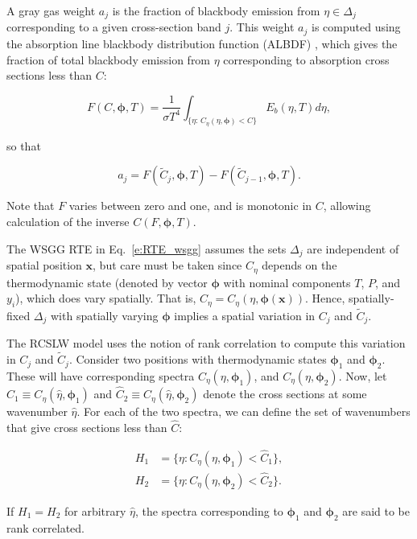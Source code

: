 \documentclass[preprint,12pt]{elsarticle}
\newcommand{\BS}{\boldsymbol}
\newcounter{bla}
\begin{document}
A gray gas weight $a_j$ is the fraction of blackbody emission from $\eta\in\Delta_j$ corresponding to a given cross-section band $j$. This weight $a_j$ is computed using the absorption line blackbody distribution function (ALBDF) \cite{Pearson_2014}, which gives the fraction of total blackbody emission from $\eta$ corresponding to absorption cross sections less than $C$: 
%
\begin{linenomath}
    \begin{equation} \label{e:albdf}
        F(C,\BS{\phi},T) = \frac{1}{\sigma T^4}\int_{\{\eta:\,C_\eta(\eta,\BS{\phi})<C\}}E_b(\eta,T)d\eta,
\end{equation}
\end{linenomath}
%
so that
%
\begin{linenomath}
    \begin{equation}\label{e:aj}
    a_j = F(\tilde{C}_j,\BS{\phi}, T) - F(\tilde{C}_{j-1}, \BS{\phi},T).
\end{equation}
\end{linenomath}
%
Note that $F$ varies between zero and one, and is monotonic in $C$, allowing calculation of the inverse $C(F,\BS{\phi},T)$.

The WSGG RTE in Eq.~\ref{e:RTE_wsgg} assumes the sets $\Delta_j$ are independent of spatial position $\mathbf{x}$, but care must be taken since $C_\eta$ depends on the thermodynamic state (denoted by vector $\BS{\phi}$ with nominal components $T$, $P$, and $y_i$), which does vary spatially. That is, $C_\eta=C_\eta(\eta,\BS{\phi}(\mathbf{x}))$. Hence, spatially-fixed $\Delta_j$ with spatially varying $\BS{\phi}$ implies a spatial variation in $C_j$ and $\tilde{C}_j$.
 
The RCSLW model uses the notion of rank correlation to compute this variation in $C_j$ and $\tilde{C}_j$. 
Consider two positions with thermodynamic states $\BS{\phi}_1$ and $\BS{\phi}_2$. These will have corresponding spectra $C_\eta(\eta,\BS{\phi}_1)$, and $C_\eta(\eta,\BS{\phi}_2)$.
Now, let $\hat{C}_1\equiv C_\eta(\hat{\eta},\BS{\phi}_1)$ and $\hat{C}_2\equiv C_\eta(\hat{\eta},\BS{\phi}_2)$ denote the cross sections at some wavenumber $\hat{\eta}$. For each of the two spectra, we can define the set of wavenumbers that give cross sections less than $\hat{C}$:
%
\begin{linenomath}
\begin{align}
    H_1&=\{\eta: C_\eta(\eta,\BS{\phi}_1)<\hat{C}_1\}, \\
    H_2&=\{\eta: C_\eta(\eta,\BS{\phi}_2)<\hat{C}_2\}.
    \end{align}
\end{linenomath}
%
If $H_1=H_2$ for arbitrary $\hat{\eta}$, the spectra corresponding to $\BS{\phi}_1$ and $\BS{\phi}_2$ are said to be rank correlated.
\end{document}
